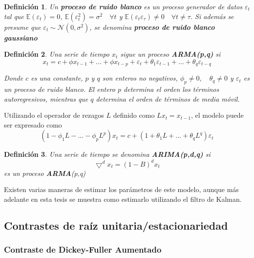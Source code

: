 \documentclass[12pt, twoside]{book}\usepackage[]{graphicx}\usepackage[]{color}
\numberwithin{equation}{section}
\numberwithin{theorem}{section}
\numberwithin{teorema}{section}
\newtheorem{defi}{Definición}
\newenvironment{defin}
      {\begin{shaded}\begin{defi}}
      {\end{defi}\end{shaded}}
\numberwithin{defi}{section}
\numberwithin{prop}{section}
\numberwithin{defi}{section}
\theoremstyle{plain}
\begin{document}
\begin{defin}
Un \textbf{proceso de ruido blanco} es un proceso generador de datos $\varepsilon_{t}$ tal que $\mathbb{E}(\varepsilon_{t})=0$, $\mathbb{E}(\varepsilon_{t}^{2})=\sigma^{2}\quad \forall t$ y $\mathbb{E}(\varepsilon_{t}\varepsilon_{\tau})\neq 0\quad \forall t\neq \tau$. Si además se presume que $\varepsilon_{t}\sim \mathcal{N}(0,\sigma^{2})$, se denomina \textbf{proceso de ruido blanco gaussiano}
\end{defin}

\begin{defin}
Una serie de tiempo $x_{t}$ sigue un proceso \textbf{ARMA(p,q)} si 
\begin{equation}
x_{t}  = c +\phi x_{t-1}+...+\phi x_{t-p}+\varepsilon_{t}+\theta_{1}\varepsilon_{t-1}+...+\theta_{q}\varepsilon_{t-q}
\end{equation}

Donde $c$ es una constante, $p$ y $q$ son enteros no negativos, $\phi_{p}\neq 0,\quad \theta_{q}\neq 0$ y $\varepsilon_{t}$ es un proceso de ruido blanco. El entero $p$ determina el orden los términos autoregresivos, mientras que $q$ determina el orden de términos de media móvil.   

\end{defin}

Utilizando el operador de rezagos $L$ definido como $Lx_{t}=x_{t-1}$, el modelo puede ser expresado como 
\begin{equation}
(1-\phi_{1}L-...-\phi_{p}L^{p})x_{t} = c+(1+\theta_{1}L+...+\theta_{q}L^{q})\varepsilon_{t}
\end{equation}

\begin{defin}
Una serie de tiempo se denomina \textbf{ARIMA(p,d,q)} si 
\begin{equation}
\bigtriangledown^{d}x_{t} = (1-B)^{d}x_{t} 
\end{equation}
es un proceso \textbf{ARMA}(p,q)
\end{defin}

Existen varias maneras de estimar los parámetros de este modelo, aunque más adelante en esta tesis se muestra como estimarlo utilizando el filtro de Kalman.

\subsection{Contrastes de raíz unitaria/estacionariedad}

\subsubsection{Contraste de Dickey-Fuller Aumentado}
\end{document}
